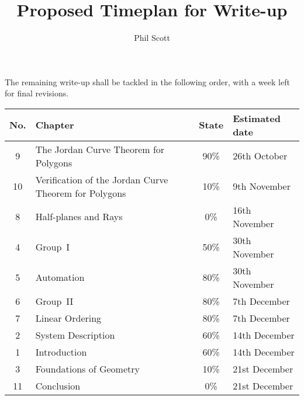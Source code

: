 \documentclass{article}
\title{Proposed Timeplan for Write-up}
\author{Phil Scott}
\begin{document}
\maketitle

The remaining write-up shall be tackled in the following order, with a week left for final revisions.
\vspace{1cm}

\begin{tabularx}{\linewidth}{c|X|c|X}
No. & Chapter & State & Estimated date\\
\hline
9 & The Jordan Curve Theorem for Polygons & 90\% & 26th October \\
10 & Verification of the Jordan Curve Theorem for Polygons & 10\% & 9th November\\
8 & Half-planes and Rays & 0\% & 16th November\\
4 & Group~I & 50\% & 30th November\\
5 & Automation & 80\% & 30th November \\
6 & Group~II & 80\% & 7th December \\
7 & Linear Ordering & 80\% & 7th December \\
2 & System Description & 60\% & 14th December \\
1 & Introduction & 60\% & 14th December\\
3 & Foundations of Geometry & 10\% & 21st December\\
11 & Conclusion & 0\% & 21st December
\end{tabularx}
\end{document}
